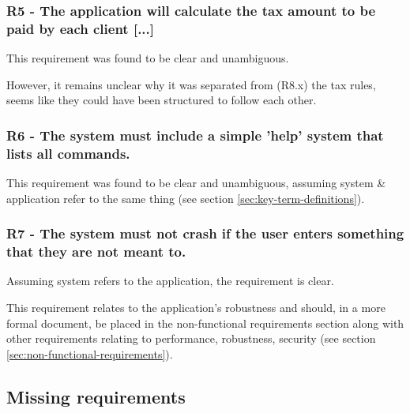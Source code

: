 \subsubsection{R5 - The application will calculate the tax amount to be paid by each client [...]} 
This requirement was found to be clear and unambiguous. 
\par
However, it remains unclear why it was separated from (R8.x) the tax rules, seems like they could have been structured to follow each other. 

\subsubsection{R6 - The system must include a simple 'help' system that lists all commands.}

This requirement was found to be clear and unambiguous, assuming system \& application refer to the same thing (see section \ref{sec:key-term-definitions}). 

\subsubsection{R7 - The system must not crash if the user enters something that they are not meant to.}

Assuming system refers to the application, the requirement is clear. 
\par
This requirement relates to the application's robustness and should, in a more formal document, be placed in the non-functional requirements section along with other requirements relating to performance, robustness, security (see section \ref{sec:non-functional-requirements}).



\subsection{Missing requirements}

